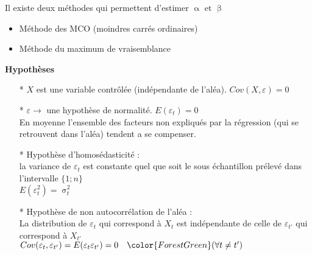 \documentclass{article}
\begin{document}
Il existe deux méthodes qui permettent d'estimer \(\upalpha \textrm{ et } \upbeta\)
\begin{itemize}
    \item Méthode des MCO (moindres carrés ordinaires)
    \item Méthode du maximum de vraisemblance
\end{itemize}
\begin{center}
    \textbf{Hypothèses}
\end{center}
\begin{itemize}
	\item[*] \(X\) est une variable contrôlée (indépendante de l'aléa). \(Cov(X,\varepsilon) = 0\)
    \item[*] $\varepsilon \rightarrow$ une hypothèse de normalité. $E(\varepsilon_t) = 0$ \\
    En moyenne l'ensemble des facteurs non expliqués par la régression (qui se retrouvent dans l'aléa) tendent a se compenser.
    \item[*] Hypothèse d'homosédasticité : 
    \\la variance de $\varepsilon_t$ est constante quel que soit le sous échantillon prélevé dans l'intervalle $\{1;n\}$ \\
    $E(\varepsilon_t^2) = \upsigma_t^2$
    \item[*] Hypothèse de non autocorrélation de l'aléa :\\
    La distribution de $\varepsilon_t$ qui correspond à $X_t$ est indépendante de celle de $\varepsilon_{t'}$ qui correspond à $X_{t'}$\\
    $Cov(\varepsilon_t,\varepsilon_{t'}) = E(\varepsilon_t \varepsilon_{t'}) = 0 \quad \color{ForestGreen}(\forall t \neq t')$
\end{itemize}
\newpage
\end{document}
